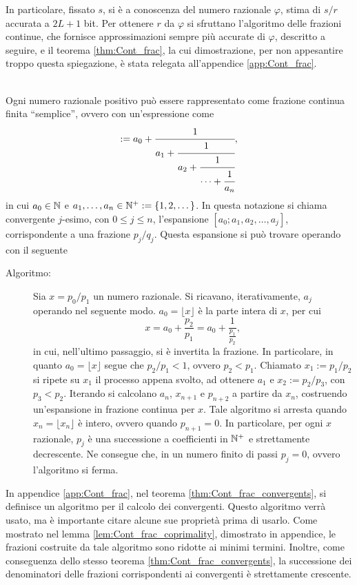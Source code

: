 In particolare, fissato $s$, si è a conoscenza del numero razionale $\varphi$, stima di $s/r$ accurata a $2L+1$ bit. 
Per ottenere $r$ da $\varphi$ si sfruttano l'algoritmo delle frazioni continue, che fornisce approssimazioni sempre più accurate di $\varphi$, descritto a seguire, e il teorema \ref{thm:Cont_frac}, la cui dimostrazione, per non appesantire troppo questa spiegazione, è stata relegata all'appendice \ref{app:Cont_frac}.
\begin{algo}\ \\
 Ogni numero razionale positivo può essere rappresentato come frazione continua finita ``semplice'', ovvero con un'espressione come
 \begin{equation}
  [a_0;a_1,a_2,\dots,a_n] := 
  a_0 + \cfrac{1}{a_1 
      + \cfrac{1}{a_2 
      + \cfrac{1}{\dots + \cfrac{1}{a_n} } } },
 \end{equation}
 in cui $a_0 \in \mathbb{N}$ e $a_1, \dots, a_n \in \mathbb{N}^+:=\left\{1,2,\dotsc\right\}$.
 In questa notazione si chiama convergente $j$-esimo, con $0 \leq j \leq n$, l'espansione $[a_0;a_1,a_2,\dots,a_j]$, corrispondente a una frazione $p_j/q_j$.
 Questa espansione si può trovare operando con il seguente
 \begin{description}
 \item[Algoritmo:] Sia $x = p_0/p_1$ un numero razionale. Si ricavano, iterativamente, $a_j$ operando nel seguente modo. $a_0 = \lfloor x \rfloor$ è la parte intera di $x$, per cui 
  \begin{equation}
   x = a_0 + \frac{p_2}{p_1} = a_0 +\frac{1}{\frac{p_1}{p_2}},
  \end{equation}
  in cui, nell'ultimo passaggio, si è invertita la frazione. In particolare, in quanto $a_0 = \lfloor x \rfloor$ segue che $p_2/p_1 < 1$, ovvero $p_2 < p_1$.
  Chiamato $x_1 := p_1/p_2$ si ripete su $x_1$ il processo appena svolto, ad ottenere $a_1$ e $x_2 := p_2/p_3$, con $p_3 < p_2$.
  Iterando si calcolano $a_n$, $x_{n+1}$ e $p_{n+2}$ a partire da $x_n$, costruendo un'espansione in frazione continua per $x$.
  Tale algoritmo si arresta quando $x_n = \lfloor x_n \rfloor$ è intero, ovvero quando $p_{n+1} = 0$.
  In particolare, per ogni $x$ razionale, $p_j$ è una successione a coefficienti in $\mathbb{N}^+$ e strettamente decrescente. Ne consegue che, in un numero finito di passi $p_j = 0$, ovvero l'algoritmo si ferma.
 \end{description}
\end{algo}
In appendice \ref{app:Cont_frac}, nel teorema \ref{thm:Cont_frac_convergents}, si definisce un algoritmo per il calcolo dei convergenti.
Questo algoritmo verrà usato, ma è importante citare alcune sue proprietà prima di usarlo.
Come mostrato nel lemma \ref{lem:Cont_frac_coprimality}, dimostrato in appendice, le frazioni costruite da tale algoritmo sono ridotte ai minimi termini.
Inoltre, come conseguenza dello stesso teorema \ref{thm:Cont_frac_convergents}, la successione dei denominatori delle frazioni corrispondenti ai convergenti è strettamente crescente.

